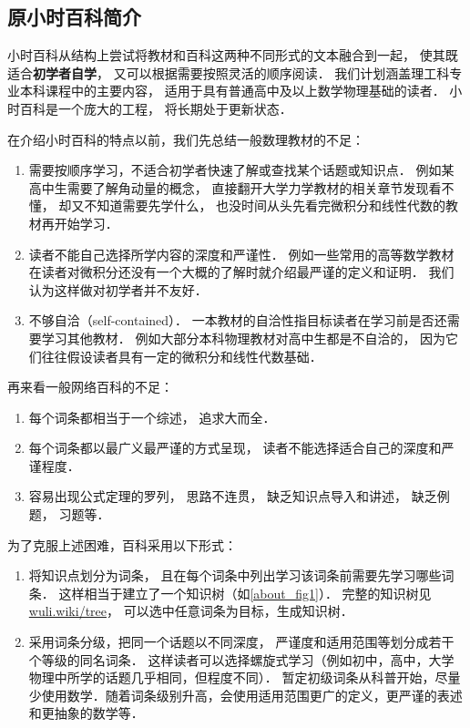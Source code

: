 \subsection{原小时百科简介}\label{about_sub1}

小时百科从结构上尝试将教材和百科这两种不同形式的文本融合到一起， 使其既适合\textbf{初学者自学}， 又可以根据需要按照灵活的顺序阅读． 我们计划涵盖理工科专业本科课程中的主要内容， 适用于具有普通高中及以上数学物理基础的读者． 小时百科是一个庞大的工程， 将长期处于更新状态．

在介绍小时百科的特点以前，我们先总结一般数理教材的不足：
\begin{enumerate}
\item 需要按顺序学习，不适合初学者快速了解或查找某个话题或知识点． 例如某高中生需要了解角动量的概念， 直接翻开大学力学教材的相关章节发现看不懂， 却又不知道需要先学什么， 也没时间从头先看完微积分和线性代数的教材再开始学习．
\item 读者不能自己选择所学内容的深度和严谨性． 例如一些常用的高等数学教材在读者对微积分还没有一个大概的了解时就介绍最严谨的定义和证明． 我们认为这样做对初学者并不友好．
\item 不够自洽（self-contained）． 一本教材的自洽性指目标读者在学习前是否还需要学习其他教材． 例如大部分本科物理教材对高中生都是不自洽的， 因为它们往往假设读者具有一定的微积分和线性代数基础．
\end{enumerate}

再来看一般网络百科的不足：
\begin{enumerate}
\item 每个词条都相当于一个综述， 追求大而全．
\item 每个词条都以最广义最严谨的方式呈现， 读者不能选择适合自己的深度和严谨程度．
\item 容易出现公式定理的罗列， 思路不连贯， 缺乏知识点导入和讲述， 缺乏例题， 习题等．
\end{enumerate}

为了克服上述困难，百科采用以下形式：
\begin{enumerate}
\item 将知识点划分为词条， 且在每个词条中列出学习该词条前需要先学习哪些词条． 这样相当于建立了一个知识树（如\autoref{about_fig1}）． 完整的知识树见 \href{https://wuli.wiki/tree}{wuli.wiki/tree}， 可以选中任意词条为目标，生成知识树．
\item 采用词条分级，把同一个话题以不同深度， 严谨度和适用范围等划分成若干个等级的同名词条． 这样读者可以选择螺旋式学习（例如初中，高中，大学物理中所学的话题几乎相同，但程度不同）． 暂定初级词条从科普开始，尽量少使用数学．随着词条级别升高，会使用适用范围更广的定义，更严谨的表述和更抽象的数学等．
\end{enumerate}

